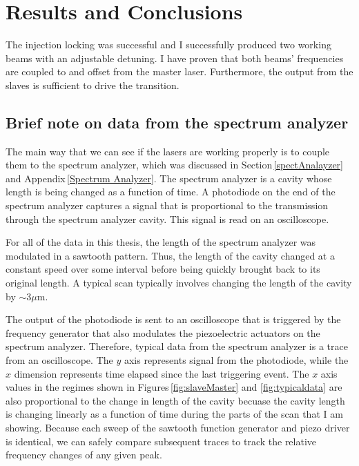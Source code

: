 \chapter{Results and Conclusions}\label{triumphantDataChapter}

The injection locking was successful and I successfully produced two working beams with an adjustable detuning. I have proven that both beams' frequencies are coupled to and offset from the master laser. Furthermore, the output from the slaves is sufficient to drive the transition. 

\section{Brief note on data from the spectrum analyzer}

The main way that we can see if the lasers are working properly is to couple them to the spectrum analyzer, which was discussed in Section\,\ref{spectAnalayzer} and Appendix\,\ref{Spectrum Analyzer}. The spectrum analyzer is a cavity whose length is being changed as a function of time. A photodiode on the end of the spectrum analyzer captures a signal that is proportional to the transmission through the spectrum analyzer cavity. This signal is read on an oscilloscope.

For all of the data in this thesis, the length of the spectrum analyzer was modulated in a sawtooth pattern. Thus, the length of the cavity changed at a constant speed over some interval before being quickly brought back to its original length. A typical scan typically involves changing the length of the cavity by $\sim$3$\mu$m. 


The output of the photodiode is sent to an oscilloscope that is triggered by the frequency generator that also modulates the piezoelectric actuators on the spectrum analyzer. Therefore, typical data from the spectrum analyzer is a trace from an oscilloscope. The $y$ axis represents signal from the photodiode, while the $x$ dimension represents time elapsed since the last triggering event. The $x$ axis values in the regimes shown in Figures\,\ref{fig:slaveMaster} and \ref{fig:typicaldata} are also proportional to the change in length of the cavity becuase the cavity length is changing linearly as a function of time during the parts of the scan that I am showing. Because each sweep of the sawtooth function generator and piezo driver is identical, we can safely compare subsequent traces to track the relative frequency changes of any given peak. 

